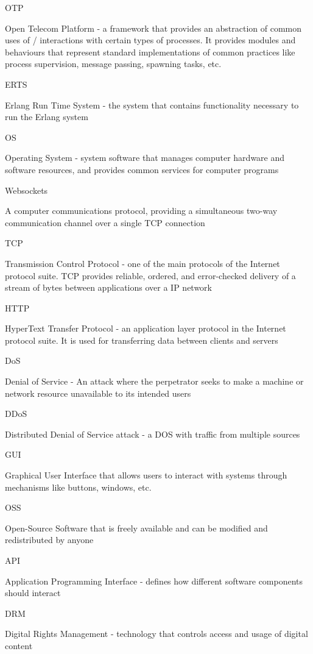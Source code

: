 \documentclass[]{final}
\begin{document}
OTP

Open Telecom Platform - a framework that provides an abstraction of common uses of / interactions with
certain types of processes. It provides modules and behaviours that represent standard implementations of
common practices like process supervision, message passing, spawning tasks, etc.

ERTS

Erlang Run Time System - the system that contains functionality necessary to run the Erlang system

OS

Operating System - system software that manages computer hardware and software resources, and
provides common services for computer programs

Websockets

A computer communications protocol, providing a simultaneous two-way communication channel
over a single TCP connection

TCP

Transmission Control Protocol - one of the main protocols of the Internet protocol suite. TCP provides
reliable, ordered, and error-checked delivery of a stream of bytes between applications over a IP network

HTTP

HyperText Transfer Protocol - an application layer protocol in the Internet protocol suite.
It is used for transferring data between clients and servers

DoS

Denial of Service - An attack where the perpetrator seeks to make a machine or network resource unavailable
to its intended users

DDoS

Distributed Denial of Service attack - a DOS with traffic from multiple sources

GUI

Graphical User Interface that allows users to interact with systems through mechanisms like buttons, windows, etc.

OSS

Open-Source Software that is freely available and can be modified and redistributed by anyone

API

Application Programming Interface - defines how different software components should interact

DRM

Digital Rights Management - technology that controls access and usage of digital content
\end{document}
